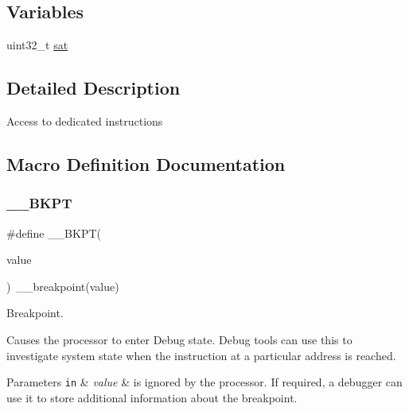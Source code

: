\subsection*{Variables}
\begin{DoxyCompactItemize}
\item 
uint32\+\_\+t \mbox{\hyperlink{group___c_m_s_i_s___core___instruction_interface_gaafcad33f86db3a8e1f55925989f9d2dc}{sat}}
\end{DoxyCompactItemize}


\subsection{Detailed Description}
Access to dedicated instructions 

\subsection{Macro Definition Documentation}
\mbox{\label{group___c_m_s_i_s___core___instruction_interface_ga15ea6bd3c507d3e81c3b3a1258e46397}} 
\subsubsection{\texorpdfstring{\+\_\+\+\_\+\+B\+K\+PT}{\_\_BKPT}\hspace{0.1cm}{\footnotesize\ttfamily [1/3]}}
{\footnotesize\ttfamily \#define \+\_\+\+\_\+\+B\+K\+PT(\begin{DoxyParamCaption}\item[{}]{value }\end{DoxyParamCaption})~\+\_\+\+\_\+breakpoint(value)}



Breakpoint. 

Causes the processor to enter Debug state. Debug tools can use this to investigate system state when the instruction at a particular address is reached. 
\begin{DoxyParams}[1]{Parameters}
\mbox{\tt in}  & {\em value} & is ignored by the processor. If required, a debugger can use it to store additional information about the breakpoint. \\
\hline
\end{DoxyParams}
\mbox{\label{group___c_m_s_i_s___core___instruction_interface_ga15ea6bd3c507d3e81c3b3a1258e46397}} 
